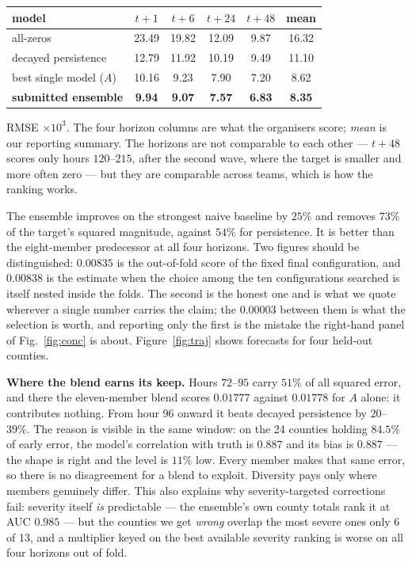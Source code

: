 \documentclass[10pt,letterpaper,twocolumn]{article}
\begin{document}
\begin{center}\small
\begin{tabular}{@{}lccccc@{}}
\toprule
model & $t{+}1$ & $t{+}6$ & $t{+}24$ & $t{+}48$ & mean \\
\midrule
all-zeros & 23.49 & 19.82 & 12.09 & 9.87 & 16.32 \\
decayed persistence & 12.79 & 11.92 & 10.19 & 9.49 & 11.10 \\
best single model ($A$) & 10.16 & 9.23 & 7.90 & 7.20 & 8.62 \\
\textbf{submitted ensemble} & \textbf{9.94} & \textbf{9.07} & \textbf{7.57} & \textbf{6.83} & \textbf{8.35} \\
\bottomrule
\end{tabular}
\end{center}
\vspace{-2pt}
{\footnotesize RMSE $\times 10^{3}$. The four horizon columns are what the
organisers score; \emph{mean} is our reporting summary. The horizons are not
comparable to each other --- $t{+}48$ scores only hours $120$--$215$, after the
second wave, where the target is smaller and more often zero --- but they are
comparable across teams, which is how the ranking works.}

The ensemble improves on the strongest naive baseline by $25\%$ and removes
$73\%$ of the target's squared magnitude, against $54\%$ for persistence. It is
better than the eight-member predecessor at all four horizons. Two figures
should be distinguished: $0.00835$ is the out-of-fold score of the fixed final
configuration, and $\mathbf{0.00838}$ is the estimate when the choice among the
ten configurations searched is itself nested inside the folds. The second is the
honest one and is what we quote wherever a single number carries the claim; the
$0.00003$ between them is what the selection is worth, and reporting only the
first is the mistake the right-hand panel of Fig.~\ref{fig:conc} is about.
Figure~\ref{fig:traj} shows forecasts for four held-out counties.

\textbf{Where the blend earns its keep.} Hours $72$--$95$ carry $51\%$ of all
squared error, and there the eleven-member blend scores $0.01777$ against
$0.01778$ for $A$ alone: it contributes nothing. From hour 96 onward it beats
decayed persistence by $20$--$39\%$. The reason is visible in the same window:
on the 24 counties holding $84.5\%$ of early error, the model's correlation with
truth is $0.887$ and its bias is $0.887$ --- the shape is right and the level is
$11\%$ low. Every member makes that same error, so there is no disagreement for
a blend to exploit. Diversity pays only where members genuinely differ. This
also explains why severity-targeted corrections fail: severity itself \emph{is}
predictable --- the ensemble's own county totals rank it at AUC $0.985$ --- but
the counties we get \emph{wrong} overlap the most severe ones only 6 of 13, and
a multiplier keyed on the best available severity ranking is worse on all four
horizons out of fold.
\end{document}
